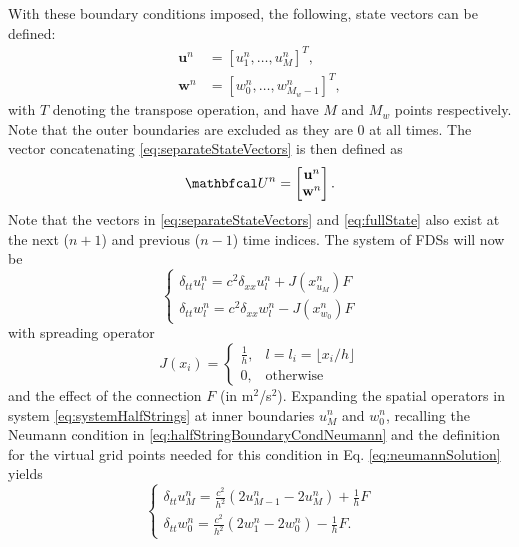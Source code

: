 With these boundary conditions imposed, the following, state vectors can be defined:
\begin{equation}
    \begin{aligned}\label{eq:separateStateVectors}
     \mathbf{u}^n &= [u_1^n, \hdots, u_M^n]^T, \\
     \mathbf{w}^n &= [w_0^n, \hdots, w_{M_w-1}^n]^T,
    \end{aligned}
\end{equation}
with $T$ denoting the transpose operation, and have $M$ and $M_{w}$ points respectively. Note that the outer boundaries are excluded as they are 0 at all times. The vector concatenating \eqref{eq:separateStateVectors} is then defined as 
\begin{equation}\label{eq:fullState}
    \U^n = \begin{bmatrix}
        \mathbf{u}^n \\
        \mathbf{w}^n
    \end{bmatrix}.
\end{equation}
Note that the vectors in \eqref{eq:separateStateVectors} and \eqref{eq:fullState} also exist at the next ($n+1$) and previous ($n-1$) time indices. The system of FDSs will now be
\begin{equation}
    \begin{cases}\label{eq:systemHalfStrings}
        \delta_{tt}u_l^n = c^2\delta_{xx}u_l^n + J(x_{u_M}^n)F\\
        \delta_{tt}w_l^n = c^2\delta_{xx}w_l^n - J(x_{w_0}^n)F
    \end{cases}
\end{equation}
with spreading operator
\begin{equation}
    J(x_i) =
    \begin{cases}
        \frac{1}{h}, & l = l_i = \lfloor x_i/h\rfloor\\
        0,& \text{otherwise}
    \end{cases}
\end{equation}
and the effect of the connection  $F$ (in m$^2$/s$^2$).
%
Expanding the spatial operators in system \eqref{eq:systemHalfStrings} at inner boundaries $u_M^n$ and $w_0^n$, recalling the Neumann condition in  \eqref{eq:halfStringBoundaryCondNeumann} and the definition for the virtual grid points needed for this condition in Eq. \eqref{eq:neumannSolution} yields
\begin{equation}\label{eq:expandedSystem}
    \begin{cases}
        \delta_{tt}u_M^n = \frac{c^2}{h^2}(2u_{M-1}^n-2u_M^n) + \frac{1}{h}F\\
        \delta_{tt}w_0^n = \frac{c^2}{h^2}(2w_1^n-2w_0^n) - \frac{1}{h}F.
    \end{cases}
\end{equation}
